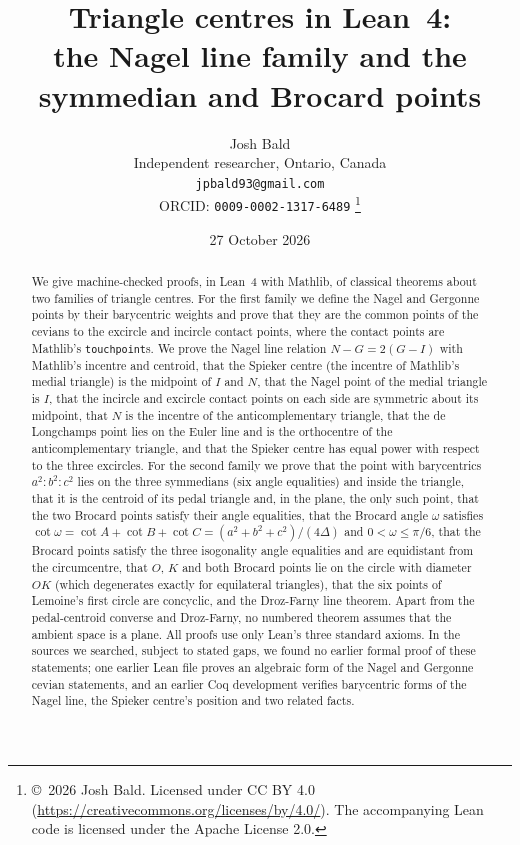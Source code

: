 \documentclass[11pt]{article}
\title{Triangle centres in Lean~4:\\ the Nagel line family and the symmedian and Brocard points}
\author{Josh Bald\\ \small Independent researcher, Ontario, Canada\\ \small\texttt{jpbald93@gmail.com}\\
\small ORCID: \texttt{0009-0002-1317-6489}
\thanks{\copyright~2026 Josh Bald. Licensed under CC BY 4.0 (\url{https://creativecommons.org/licenses/by/4.0/}). The accompanying Lean code is licensed under the Apache License 2.0.}}
\date{27 October 2026}
\theoremstyle{definition}
\theoremstyle{remark}
\begin{document}
\sloppy
\maketitle
\begin{abstract}
We give machine-checked proofs, in Lean~4 with Mathlib, of classical theorems about two families of
triangle centres. For the first family we define the Nagel and Gergonne points by their barycentric
weights and prove that they are the common points of the cevians to the excircle and incircle contact
points, where the contact points are Mathlib's \texttt{touchpoint}s. We prove the Nagel line
relation $N-G=2(G-I)$ with Mathlib's incentre and centroid, that the Spieker centre (the incentre of
Mathlib's medial triangle) is the midpoint of $I$ and $N$, that the Nagel point of the medial triangle
is $I$, that the incircle and excircle contact points on each side are symmetric about its midpoint,
that $N$ is the incentre of the anticomplementary triangle, that the de Longchamps point lies on the
Euler line and is the orthocentre of the anticomplementary triangle, and that the Spieker centre has
equal power with respect to the three excircles. For the second family we prove that the point with
barycentrics $a^2:b^2:c^2$ lies on the three symmedians (six angle equalities) and inside the triangle,
that it is the centroid of its pedal triangle and, in the plane, the only such point, that the two
Brocard points satisfy their angle equalities, that the Brocard angle $\omega$ satisfies
$\cot\omega=\cot A+\cot B+\cot C=(a^2+b^2+c^2)/(4\Delta)$ and $0<\omega\le\pi/6$, that the Brocard
points satisfy the three isogonality angle equalities and are equidistant from the circumcentre, that $O$, $K$ and both Brocard points lie
on the circle with diameter $OK$ (which degenerates exactly for equilateral triangles), that the six
points of Lemoine's first circle are concyclic, and the Droz-Farny line theorem. Apart from the
pedal-centroid converse and Droz-Farny, no numbered theorem assumes that the ambient space is a plane. All proofs
use only Lean's three standard axioms. In the sources we searched, subject to stated gaps, we found
no earlier formal proof of these statements; one earlier Lean file proves an algebraic form of the
Nagel and Gergonne cevian statements, and an earlier Coq development verifies barycentric forms of
the Nagel line, the Spieker centre's position and two related facts.
\end{abstract}
\end{document}
